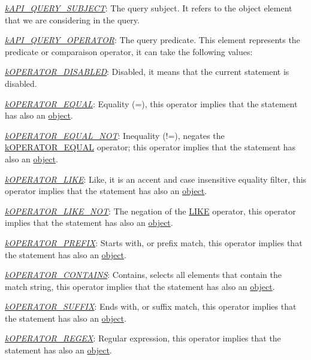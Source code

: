 \begin{DoxyItemize}
\item {\itshape \hyperlink{}{k\-A\-P\-I\-\_\-\-Q\-U\-E\-R\-Y\-\_\-\-S\-U\-B\-J\-E\-C\-T}}\-: The query subject. It refers to the object element that we are considering in the query. 
\item {\itshape \hyperlink{}{k\-A\-P\-I\-\_\-\-Q\-U\-E\-R\-Y\-\_\-\-O\-P\-E\-R\-A\-T\-O\-R}}\-: The query predicate. This element represents the predicate or comparaison operator, it can take the following values\-: 
\begin{DoxyItemize}
\item {\itshape \hyperlink{}{k\-O\-P\-E\-R\-A\-T\-O\-R\-\_\-\-D\-I\-S\-A\-B\-L\-E\-D}}\-: Disabled, it means that the current statement is disabled. 
\item {\itshape \hyperlink{}{k\-O\-P\-E\-R\-A\-T\-O\-R\-\_\-\-E\-Q\-U\-A\-L}}\-: Equality (=), this operator implies that the statement has also an \hyperlink{}{object}. 
\item {\itshape \hyperlink{}{k\-O\-P\-E\-R\-A\-T\-O\-R\-\_\-\-E\-Q\-U\-A\-L\-\_\-\-N\-O\-T}}\-: Inequality (!=), negates the \hyperlink{}{k\-O\-P\-E\-R\-A\-T\-O\-R\-\_\-\-E\-Q\-U\-A\-L} operator; this operator implies that the statement has also an \hyperlink{}{object}. 
\item {\itshape \hyperlink{}{k\-O\-P\-E\-R\-A\-T\-O\-R\-\_\-\-L\-I\-K\-E}}\-: Like, it is an accent and case insensitive equality filter, this operator implies that the statement has also an \hyperlink{}{object}. 
\item {\itshape \hyperlink{}{k\-O\-P\-E\-R\-A\-T\-O\-R\-\_\-\-L\-I\-K\-E\-\_\-\-N\-O\-T}}\-: The negation of the \hyperlink{}{L\-I\-K\-E} operator, this operator implies that the statement has also an \hyperlink{}{object}. 
\item {\itshape \hyperlink{}{k\-O\-P\-E\-R\-A\-T\-O\-R\-\_\-\-P\-R\-E\-F\-I\-X}}\-: Starts with, or prefix match, this operator implies that the statement has also an \hyperlink{}{object}. 
\item {\itshape \hyperlink{}{k\-O\-P\-E\-R\-A\-T\-O\-R\-\_\-\-C\-O\-N\-T\-A\-I\-N\-S}}\-: Contains, selects all elements that contain the match string, this operator implies that the statement has also an \hyperlink{}{object}. 
\item {\itshape \hyperlink{}{k\-O\-P\-E\-R\-A\-T\-O\-R\-\_\-\-S\-U\-F\-F\-I\-X}}\-: Ends with, or suffix match, this operator implies that the statement has also an \hyperlink{}{object}. 
\item {\itshape \hyperlink{}{k\-O\-P\-E\-R\-A\-T\-O\-R\-\_\-\-R\-E\-G\-E\-X}}\-: Regular expression, this operator implies that the statement has also an \hyperlink{}{object}. 

\end{DoxyItemize}
\end{DoxyItemize}
